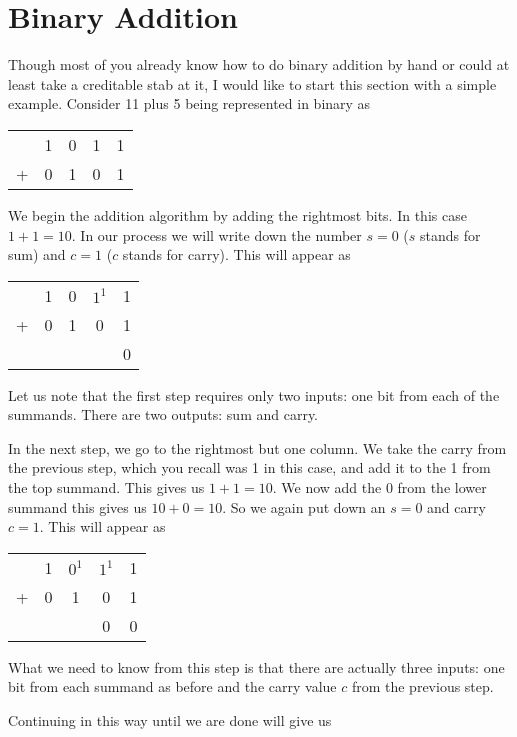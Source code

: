 \section{Binary Addition}
Though most of you already know how to do binary addition by hand or could at least take a creditable stab at it, I would like to start this section with a simple example.  Consider 11 plus 5 being represented in binary as
\begin{center}
	\begin{tabular}{ccccc} 
		& 1 & 0 & 1 & 1 \\
	  + & 0 & 1 & 0 & 1
	\end{tabular}
\end{center}

We begin the addition algorithm by adding the rightmost bits.  In this case $1 + 1 = 10$.  In our process we will write down the number $s=0$ ($s$ stands for sum) and $c=1$ ($c$ stands for carry).  This will appear as
\begin{center}
	\begin{tabular}{ccccc} 
		& 1 & 0 & $1^1$ & 1 \\
		+ & 0 & 1 & 0 & 1 \\ \hline
		&   &   &       & 0
	\end{tabular}
\end{center}

Let us note that the first step requires only two inputs: one bit from each of the summands.  There are two outputs: sum and carry.

In the next step, we go to the rightmost but one column. We take the carry from the previous step, which you recall was 1 in this case, and add it to the 1 from the top summand.  This gives us $1+1 = 10$.  We now add the 0 from the lower summand this gives us $10 + 0 = 10$. So we again put down an $s=0$ and carry $c= 1$.  This will appear as
\begin{center}
	\begin{tabular}{ccccc} 
		& 1 & $0^1$ & $1^1$ & 1 \\
		+ & 0 & 1 & 0 & 1 \\ \hline
		&   &   &   0    & 0
	\end{tabular}
\end{center}

What we need to know from this step is that there are actually three inputs: one bit from each summand as before and the carry value $c$ from the previous step.

Continuing in this way until we are done will give us

